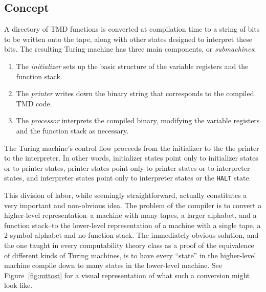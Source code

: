 \documentclass[11pt]{article}
\begin{document}
\subsection{Concept}

A directory of TMD functions is converted at compilation time to a string of bits to be written onto the tape, along with other states designed to interpret these bits. The resulting Turing machine has three main components, or \emph{submachines}:

\begin{enumerate}
\item The \emph{initializer} sets up the basic structure of the variable registers and the function stack.
\item The \emph{printer} writes down the binary string that corresponds to the compiled TMD code.
\item The \emph{processor} interprets the compiled binary, modifying the variable registers and the function stack as necessary.
\end{enumerate}

The Turing machine's control flow proceeds from the initializer to the the printer to the interpreter. In other words, initializer states point only to initializer states or to printer states, printer states point only to printer states or to interpreter states, and interpreter states point only to interpreter states or the \texttt{HALT} state. 

This division of labor, while seemingly straightforward, actually constitutes a very important and non-obvious idea. The problem of the compiler is to convert a higher-level representation--a machine with many tapes, a larger alphabet, and a function stack--to the lower-level representation of a machine with a single tape, a 2-symbol alphabet and no function stack. The immediately obvious solution, and the one taught in every computability theory class as a proof of the equivalence of different kinds of Turing machines, is to have every ``state'' in the higher-level machine compile down to many states in the lower-level machine. See Figure~\ref{fig:mttost} for a visual representation of what such a conversion might look like. \\
\end{document}
